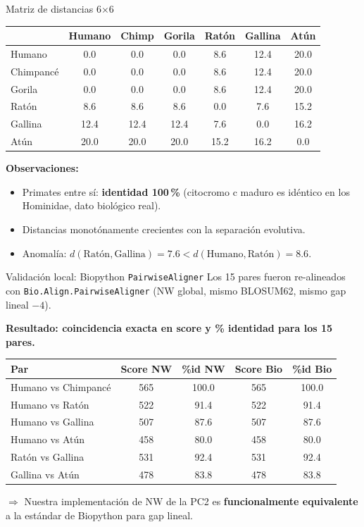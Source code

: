 \documentclass[10pt,aspectratio=169]{beamer}
\begin{document}
\begin{frame}{Matriz de distancias 6$\times$6}
\centering
\begin{tabular}{lcccccc}
\toprule
            & Humano & Chimp & Gorila & Rat\'on & Gallina & At\'un \\
\midrule
Humano      & 0.0  & 0.0  & 0.0  & 8.6  & 12.4 & 20.0 \\
Chimpanc\'e & 0.0  & 0.0  & 0.0  & 8.6  & 12.4 & 20.0 \\
Gorila      & 0.0  & 0.0  & 0.0  & 8.6  & 12.4 & 20.0 \\
Rat\'on     & 8.6  & 8.6  & 8.6  & 0.0  & \alert{7.6}  & 15.2 \\
Gallina     & 12.4 & 12.4 & 12.4 & \alert{7.6}  & 0.0  & 16.2 \\
At\'un      & 20.0 & 20.0 & 20.0 & 15.2 & 16.2 & 0.0 \\
\bottomrule
\end{tabular}

\bigskip
\textbf{Observaciones:}
\begin{itemize}
  \item Primates entre s\'i: \textbf{identidad 100\,\%} (citocromo c maduro es id\'entico en los Hominidae, dato biol\'ogico real).
  \item Distancias monot\'onamente crecientes con la separaci\'on evolutiva.
  \item \alert{Anomal\'ia:} $d(\text{Rat\'on},\text{Gallina}) = 7.6 < d(\text{Humano},\text{Rat\'on}) = 8.6$.
\end{itemize}
\end{frame}

\begin{frame}{Validaci\'on local: Biopython \texttt{PairwiseAligner}}
Los 15 pares fueron re-alineados con \texttt{Bio.Align.PairwiseAligner} (NW global, mismo BLOSUM62, mismo gap lineal $-4$).
\medskip

\textbf{Resultado: coincidencia exacta en score y \% identidad para los 15 pares.}

\smallskip
{\small\begin{tabular}{lcccc}
\toprule
Par & Score NW & \%id NW & Score Bio & \%id Bio \\
\midrule
Humano vs Chimpanc\'e & 565 & 100.0 & 565 & 100.0 \\
Humano vs Rat\'on     & 522 & 91.4  & 522 & 91.4  \\
Humano vs Gallina     & 507 & 87.6  & 507 & 87.6  \\
Humano vs At\'un      & 458 & 80.0  & 458 & 80.0  \\
Rat\'on vs Gallina    & 531 & 92.4  & 531 & 92.4  \\
Gallina vs At\'un     & 478 & 83.8  & 478 & 83.8  \\
\bottomrule
\end{tabular}}

\bigskip
$\Rightarrow$ Nuestra implementaci\'on de NW de la PC2 es \textbf{funcionalmente equivalente} a la est\'andar de Biopython para gap lineal.
\end{frame}
\end{document}
